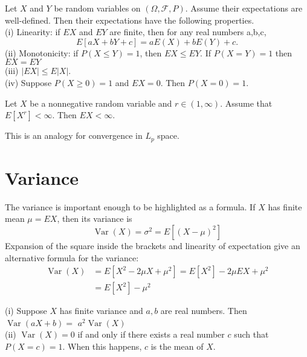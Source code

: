 \documentclass[11pt]{elegantbook}
\begin{document}
\begin{proposition}
 Let $X$ and $Y$ be random variables on $(\Omega, \mathcal{F}, P)$. Assume their expectations are well-defined. Then their expectations have the following properties.\\
(i) Linearity: if $E X$ and $E Y$ are finite, then for any real numbers a,b,c,
$$
E[a X+b Y+c]=a E(X)+b E(Y)+c .
$$
(ii) Monotonicity: if $P(X \leq Y)=1$, then $E X \leq E Y$. If $P(X=Y)=1$ then $E X=E Y$\\
(iii) $|E X| \leq E|X|$.\\
(iv) Suppose $P(X \geq 0)=1$ and $E X=0$. Then $P(X=0)=1$.
\end{proposition}

\begin{theorem}
    
    Let $X$ be a nonnegative random variable and $r \in(1, \infty)$. Assume that $E\left[X^r\right]<\infty$. Then $E X<\infty$.
\end{theorem}
\begin{note}
    This is an analogy for convergence in $L_p$ space.
\end{note}

\section{Variance}
    \begin{definition}
        The variance is important enough to be highlighted as a formula. If $X$ has finite mean $\mu=E X$, then its variance is
$$
\operatorname{Var}(X)=\sigma^2=E\left[(X-\mu)^2\right]
$$
Expansion of the square inside the brackets and linearity of expectation give an alternative formula for the variance:
$$
\begin{aligned}
\operatorname{Var}(X) & =E\left[X^2-2 \mu X+\mu^2\right]=E\left[X^2\right]-2 \mu E X+\mu^2 \\
& =E\left[X^2\right]-\mu^2
\end{aligned}
$$
    \end{definition}

\begin{theorem}
    (i) Suppose $X$ has finite variance and $a, b$ are real numbers. Then $\operatorname{Var}(a X+b)=$ $a^2 \operatorname{Var}(X)$\\
(ii) $\operatorname{Var}(X)=0$ if and only if there exists a real number $c$ such that $P(X=c)=1$. When this happens, $c$ is the mean of $X$.
\end{theorem}
\end{document}
